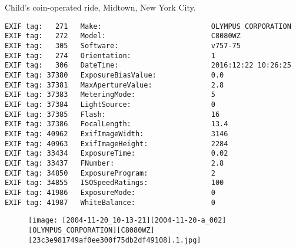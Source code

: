 \section{\protect{}}
\noindent Child's coin-operated ride, Midtown, New York City.
\noindent
\begin{lstlisting}
EXIF tag:   271   Make:                          OLYMPUS CORPORATION
EXIF tag:   272   Model:                         C8080WZ
EXIF tag:   305   Software:                      v757-75
EXIF tag:   274   Orientation:                   1
EXIF tag:   306   DateTime:                      2016:12:22 10:26:25
EXIF tag: 37380   ExposureBiasValue:             0.0
EXIF tag: 37381   MaxApertureValue:              2.8
EXIF tag: 37383   MeteringMode:                  5
EXIF tag: 37384   LightSource:                   0
EXIF tag: 37385   Flash:                         16
EXIF tag: 37386   FocalLength:                   13.4
EXIF tag: 40962   ExifImageWidth:                3146
EXIF tag: 40963   ExifImageHeight:               2284
EXIF tag: 33434   ExposureTime:                  0.02
EXIF tag: 33437   FNumber:                       2.8
EXIF tag: 34850   ExposureProgram:               2
EXIF tag: 34855   ISOSpeedRatings:               100
EXIF tag: 41986   ExposureMode:                  0
EXIF tag: 41987   WhiteBalance:                  0

\end{lstlisting}
\clearpage
\begin{figure}
\raggedleft
\texttt{[image: [2004-11-20\_10-13-21][2004-11-20-a\_002][OLYMPUS\_CORPORATION][C8080WZ][23c3e981749af0ee300f75db2df49108].1.jpg]}
\end{figure}


\clearpage
